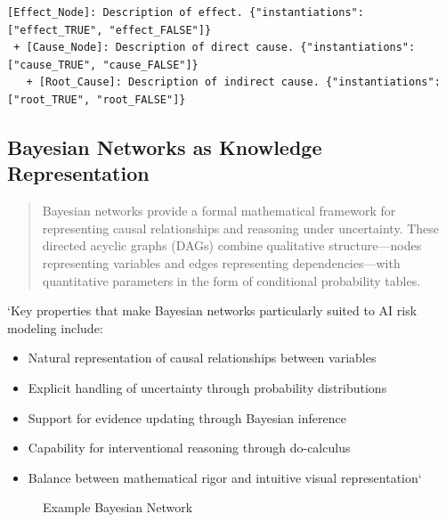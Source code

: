 \documentclass[]{book}
\providecommand{\tightlist}{%
  \setlength{\itemsep}{0pt}\setlength{\parskip}{0pt}}
\begin{document}
\begin{verbatim}
[Effect_Node]: Description of effect. {"instantiations": ["effect_TRUE", "effect_FALSE"]}
 + [Cause_Node]: Description of direct cause. {"instantiations": ["cause_TRUE", "cause_FALSE"]}
   + [Root_Cause]: Description of indirect cause. {"instantiations": ["root_TRUE", "root_FALSE"]}
\end{verbatim}

\subsection{Bayesian Networks as Knowledge
Representation}\label{sec-bayesian-networks}

\begin{quote}
Bayesian networks provide a formal mathematical framework for
representing causal relationships and reasoning under uncertainty. These
directed acyclic graphs (DAGs) combine qualitative structure---nodes
representing variables and edges representing dependencies---with
quantitative parameters in the form of conditional probability tables.
\end{quote}

`Key properties that make Bayesian networks particularly suited to AI
risk modeling include:

\begin{itemize}
\tightlist
\item
  Natural representation of causal relationships between variables
\item
  Explicit handling of uncertainty through probability distributions
\item
  Support for evidence updating through Bayesian inference
\item
  Capability for interventional reasoning through do-calculus
\item
  Balance between mathematical rigor and intuitive visual
  representation`
\end{itemize}

\begin{figure}


\caption{\label{fig-bayesian-network}Example Bayesian Network}

\end{figure}%
\end{document}
